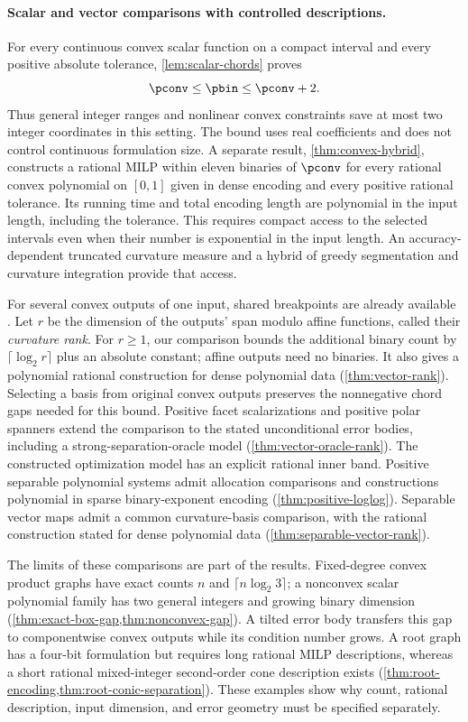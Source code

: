 \paragraph{Scalar and vector comparisons with controlled descriptions.}
For every continuous convex scalar function on a compact interval and
every positive absolute tolerance, \cref{lem:scalar-chords} proves
\[
 \pconv\le\pbin\le\pconv+2.
\]
Thus general integer ranges and nonlinear convex constraints save at most
two integer coordinates in this setting. The bound uses real coefficients
and does not control continuous formulation size. A separate result,
\cref{thm:convex-hybrid}, constructs a rational MILP within eleven binaries
of $\pconv$ for every rational convex polynomial on $[0,1]$ given in dense
encoding and every positive rational tolerance. Its running time and total
encoding length are polynomial in the input length, including the tolerance.
This requires
compact access to the selected intervals even when their number is
exponential in the input length. An accuracy-dependent truncated curvature
measure and a hybrid of greedy segmentation and curvature integration
provide that access.

For several convex outputs of one input, shared breakpoints are already
available \citep{lyu2026}. Let $r$ be the dimension of the outputs' span
modulo affine functions, called their \emph{curvature rank}. For $r\ge1$,
our comparison bounds the additional binary count by $\lceil\log_2r\rceil$
plus an absolute constant; affine outputs need no binaries. It also gives
a polynomial rational construction for dense polynomial data
(\cref{thm:vector-rank}). Selecting a basis from original convex outputs
preserves the nonnegative chord gaps needed for this bound. Positive facet
scalarizations and positive polar spanners extend the comparison to the
stated unconditional error bodies, including a strong-separation-oracle
model (\cref{thm:vector-oracle-rank}). The constructed optimization model
has an explicit rational inner band. Positive separable polynomial systems
admit allocation comparisons and constructions polynomial in sparse
binary-exponent encoding (\cref{thm:positive-loglog}). Separable vector
maps admit a common curvature-basis comparison, with the rational
construction stated for dense polynomial data
(\cref{thm:separable-vector-rank}).

The limits of these comparisons are part of the results. Fixed-degree
convex product graphs have exact counts $n$ and $\lceil n\log_2 3\rceil$;
a nonconvex scalar polynomial family has two general integers and growing
binary dimension (\cref{thm:exact-box-gap,thm:nonconvex-gap}). A tilted
error body transfers this gap to componentwise convex outputs while its
condition number grows. A root graph has a four-bit formulation but
requires long rational MILP descriptions, whereas a short rational
mixed-integer second-order cone description exists
(\cref{thm:root-encoding,thm:root-conic-separation}). These examples show why
count, rational description, input dimension, and error geometry must be
specified separately.

